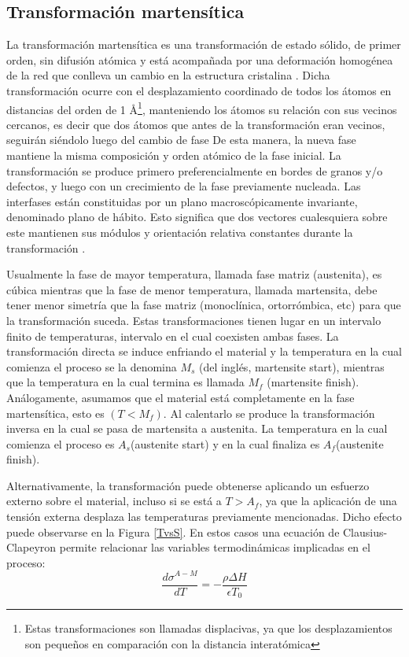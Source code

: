 \documentclass[12pt]{article}
\theoremstyle{definition}
\theoremstyle{remark}
\begin{document}
\subsection{Transformación martensítica}

La transformación martensítica es una transformación de estado sólido, de primer orden, sin difusión atómica y está acompañada por una deformación homogénea de la red que conlleva un cambio en la estructura cristalina \cite{Santamarta}. Dicha transformación ocurre con el desplazamiento coordinado de todos los átomos en distancias del orden de 1 \AA \footnote{Estas transformaciones son llamadas displacivas, ya que los desplazamientos son pequeños en comparación con la distancia interatómica}, manteniendo los átomos su relación con sus vecinos cercanos, es decir que dos átomos que antes de la transformación eran vecinos, seguirán siéndolo luego del cambio de fase\citep{HTSMA} De esta manera, la nueva fase mantiene la misma composición y orden atómico de la fase inicial. La transformación se produce primero preferencialmente en bordes de granos y/o defectos, y luego con un crecimiento de la fase previamente nucleada. Las interfases están constituidas por un plano macroscópicamente invariante, denominado plano de hábito. Esto significa que dos vectores cualesquiera sobre este mantienen sus módulos y orientación relativa constantes durante la transformación \cite{Santamarta}.

Usualmente la fase de mayor temperatura, llamada fase matriz (austenita), es cúbica mientras que la fase de menor temperatura, llamada martensita, debe tener menor simetría que la fase matriz (monoclínica, ortorrómbica, etc) para que la transformación suceda\cite{Malvasio}. Estas transformaciones tienen lugar en un intervalo finito de temperaturas, intervalo en el cual coexisten ambas fases. La transformación directa se induce enfriando el material y la temperatura en la cual comienza el proceso se la denomina $M_s$ (del inglés, martensite start), mientras que la temperatura en la cual termina es llamada $M_f$ (martensite finish). Análogamente, asumamos que el material está completamente en la fase martensítica, esto es $(T < M_f)$. Al calentarlo se produce la transformación inversa en la cual se pasa de martensita a austenita. La temperatura en la cual comienza el proceso es $A_s$(austenite start) y en la cual finaliza es $A_f$(austenite finish).\cite{Santamarta}

Alternativamente, la transformación puede obtenerse aplicando un esfuerzo externo sobre el material, incluso si se está a $T > A_f$, ya que la aplicación de una tensión externa desplaza las temperaturas previamente mencionadas. Dicho efecto puede observarse en la Figura \ref{TvsS}. En estos casos una ecuación de Clausius-Clapeyron permite relacionar las variables termodinámicas implicadas en el proceso:
\begin{equation}
	\frac{d\sigma^{A-M}}{dT} = -\frac{\rho \Delta H}{\epsilon T_0}
\end{equation}
\end{document}
